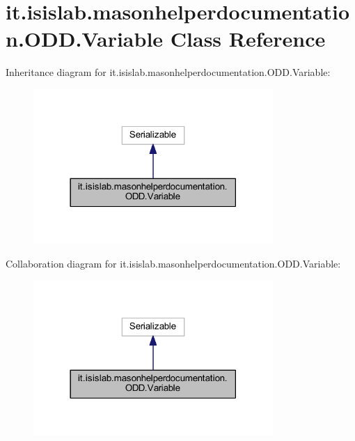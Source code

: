 \hypertarget{classit_1_1isislab_1_1masonhelperdocumentation_1_1_o_d_d_1_1_variable}{\section{it.\-isislab.\-masonhelperdocumentation.\-O\-D\-D.\-Variable Class Reference}
\label{classit_1_1isislab_1_1masonhelperdocumentation_1_1_o_d_d_1_1_variable}
}


Inheritance diagram for it.\-isislab.\-masonhelperdocumentation.\-O\-D\-D.\-Variable\-:
\nopagebreak
\begin{figure}[H]
\begin{center}
\leavevmode
\includegraphics[width=258pt]{classit_1_1isislab_1_1masonhelperdocumentation_1_1_o_d_d_1_1_variable__inherit__graph}
\end{center}
\end{figure}


Collaboration diagram for it.\-isislab.\-masonhelperdocumentation.\-O\-D\-D.\-Variable\-:
\nopagebreak
\begin{figure}[H]
\begin{center}
\leavevmode
\includegraphics[width=258pt]{classit_1_1isislab_1_1masonhelperdocumentation_1_1_o_d_d_1_1_variable__coll__graph}
\end{center}
\end{figure}
